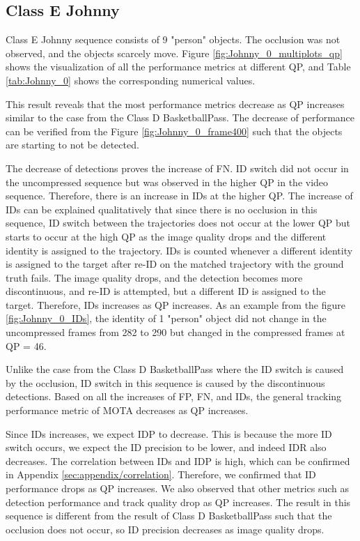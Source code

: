 \subsection{Class E Johnny}
Class E Johnny sequence consists of 9 "person" objects. The occlusion was not observed, and the objects scarcely move. Figure \ref{fig:Johnny_0_multiplots_qp} shows the visualization of all the performance metrics at different QP, and Table \ref{tab:Johnny_0} shows the corresponding numerical values. 


This result reveals that the most performance metrics decrease as QP increases similar to the case from the Class D BasketballPass. The decrease of performance can be verified from the Figure \ref{fig:Johnny_0_frame400} such that the objects are starting to not be detected.

The decrease of detections proves the increase of FN. ID switch did not occur in the uncompressed sequence but was observed in the higher QP in the video sequence. Therefore, there is an increase in IDs at the higher QP. The increase of IDs can be explained qualitatively that since there is no occlusion in this sequence, ID switch between the trajectories does not occur at the lower QP but starts to occur at the high QP as the image quality drops and the different identity is assigned to the trajectory. IDs is counted whenever a different identity is assigned to the target after re-ID on the matched trajectory with the ground truth fails. The image quality drops, and the detection becomes more discontinuous, and re-ID is attempted, but a different ID is assigned to the target. Therefore, IDs increases as QP increases. As an example from the figure \ref{fig:Johnny_0_IDs}, the identity of 1 "person" object did not change in the uncompressed frames from 282 to 290 but changed in the compressed frames at QP = 46.

Unlike the case from the Class D BasketballPass where the ID switch is caused by the occlusion, ID switch in this sequence is caused by the discontinuous detections. Based on all the increases of FP, FN, and IDs, the general tracking performance metric of MOTA decreases as QP increases.

Since IDs increases, we expect IDP to decrease. This is because the more ID switch occurs, we expect the ID precision to be lower, and indeed IDR also decreases. The correlation between IDs and IDP is high, which can be confirmed in Appendix \ref{sec:appendix/correlation}. Therefore, we confirmed that ID performance drops as QP increases. We also observed that other metrics such as detection performance and track quality drop as QP increases. The result in this sequence is different from the result of Class D BasketballPass such that the occlusion does not occur, so ID precision decreases as image quality drops.

